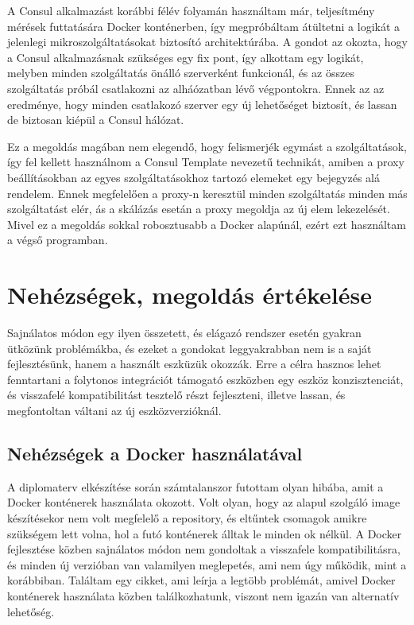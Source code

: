 \documentclass[11pt,magyar,a4paper,twoside,]{report}
\begin{document}
A Consul alkalmazást korábbi félév folyamán használtam már, teljesítmény
mérések futtatására Docker konténerben, így megpróbáltam átültetni a
logikát a jelenlegi mikroszolgáltatásokat biztosító architektúrába. A
gondot az okozta, hogy a Consul alkalmazásnak szükséges egy fix pont,
így alkottam egy logikát, melyben minden szolgáltatás önálló szerverként
funkcionál, és az összes szolgáltatás próbál csatlakozni az alháózatban
lévő végpontokra. Ennek az az eredménye, hogy minden csatlakozó szerver
egy új lehetőséget biztosít, és lassan de biztosan kiépül a Consul
hálózat.

Ez a megoldás magában nem elegendő, hogy felismerjék egymást a
szolgáltatások, így fel kellett használnom a Consul Template nevezetű
technikát, amiben a proxy beállításokban az egyes szolgáltatásokhoz
tartozó elemeket egy bejegyzés alá rendelem. Ennek megfelelően a proxy-n
keresztül minden szolgáltatás minden más szolgáltatást elér, ás a
skálázás esetán a proxy megoldja az új elem lekezelését. Mivel ez a
megoldás sokkal robosztusabb a Docker alapúnál, ezért ezt használtam a
végső programban.

\section{Nehézségek, megoldás
értékelése}\label{nehuxe9zsuxe9gek-megolduxe1s-uxe9rtuxe9keluxe9se}

Sajnálatos módon egy ilyen összetett, és elágazó rendszer esetén gyakran
ütközünk problémákba, és ezeket a gondokat leggyakrabban nem is a saját
fejlesztésünk, hanem a használt eszküzük okozzák. Erre a célra hasznos
lehet fenntartani a folytonos integrációt támogató eszközben egy eszköz
konzisztenciát, és visszafelé kompatibilitást tesztelő részt
fejleszteni, illetve lassan, és megfontoltan váltani az új
eszközverzióknál.

\subsection{Nehézségek a Docker
használatával}\label{nehuxe9zsuxe9gek-a-docker-hasznuxe1latuxe1val}

A diplomaterv elkészítése során számtalanszor futottam olyan hibába,
amit a Docker konténerek használata okozott. Volt olyan, hogy az alapul
szolgáló image készítésekor nem volt megfelelő a repository, és eltűntek
csomagok amikre szükségem lett volna, hol a futó konténerek álltak le
minden ok nélkül. A Docker fejlesztése közben sajnálatos módon nem
gondoltak a visszafele kompatibilitásra, és minden új verzióban van
valamilyen meglepetés, ami nem úgy működik, mint a korábbiban. Találtam
egy cikket\citep{docker-is-bad}, ami leírja a legtöbb problémát, amivel
Docker konténerek használata közben találkozhatunk, viszont nem igazán
van alternatív lehetőség.
\end{document}
